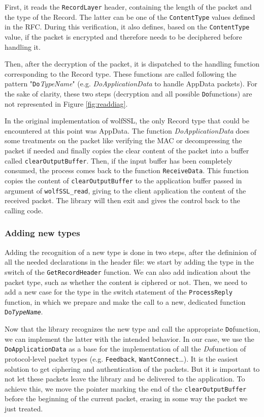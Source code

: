 First, it reads the \texttt{RecordLayer} header, containing the length of the packet and the type of the Record. The latter can be one of the \texttt{ContentType} values defined in the RFC\cite{RFC5246}. During this verification, it also defines, based on the \texttt{ContentType} value, if the packet is encrypted and therefore needs to be deciphered before handling it.

Then, after the decryption of the packet, it is dispatched to the handling function corresponding to the Record type. These functions are called following the pattern "\texttt{Do}\textit{TypeName}" (e.g. \textit{DoApplicationData} to handle AppData packets). For the sake of clarity, these two steps (decryption and all possible \texttt{Do}functions) are not represented in Figure \ref{fig:readdiag}.


In the original implementation of wolfSSL, the only Record type that could be encountered at this point was AppData. The function \textit{DoApplicationData} does some treatments on the packet like verifying the MAC or decompressing the packet if needed and finally copies the clear content of the packet into a buffer called \texttt{clearOutputBuffer}. Then, if the input buffer has been completely consumed, the process comes back to the function \texttt{ReceiveData}. This function copies the content of \texttt{clearOutputBuffer} to the application buffer passed in argument of \texttt{wolfSSL\_read}, giving to the client application the content of the received packet. The library will then exit and gives the control back to the calling code.

\subsubsection{Adding new types}

Adding the recognition of a new type is done in two steps, after the defininion of all the needed declarations in the header file: we start by adding the type in the switch of the \texttt{GetRecordHeader} function. We can also add indication about the packet type, such as whether the content is ciphered or not. Then, we need to add a new case for the type in the switch statement of the \texttt{ProcessReply} function, in which we prepare and make the call to a new, dedicated function \texttt{Do\textit{TypeName}}.

Now that the library recognizes the new type and call the appropriate \texttt{Do}function, we can implement the latter with the intended behavior. In our case, we use the \texttt{DoApplicationData} as a base for the implementation of all the \textit{Do}function of protocol-level packet types (e.g. \texttt{Feedback}, \texttt{WantConnect}\dots). It is the easiest solution to get ciphering and authentication of the packets. But it is important to not let these packets leave the library and be delivered to the application. To achieve this, we move the pointer marking the end of the \texttt{clearOutputBuffer} before the beginning of the current packet, erasing in some way the packet we just treated.

